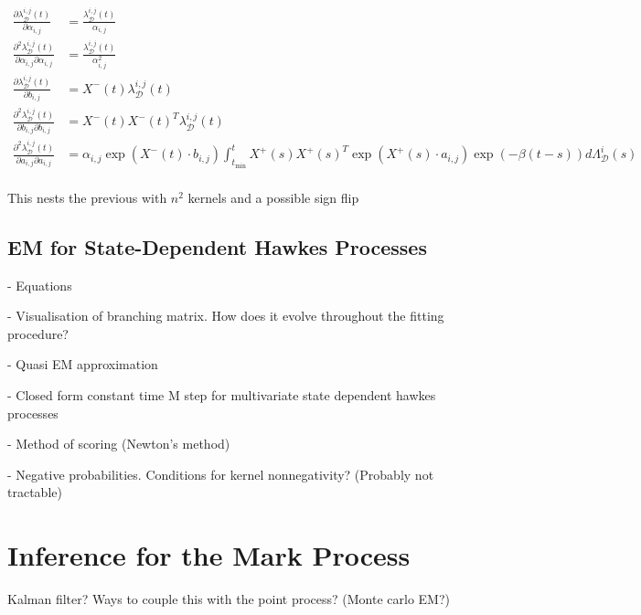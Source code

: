 \documentclass[honours,12pt]{unswthesis}
\numberwithin{equation}{section}
\begin{document}
\begin{equation*}
\begin{align}
		\frac{\partial \lambda_\mathcal{D}^{i,j}(t)}{\partial \alpha_{i,j}} &= \frac{\lambda_\mathcal{D}^{i,j}(t)}{\alpha_{i,j}} \\
		\frac{\partial^2 \lambda_\mathcal{D}^{i,j}(t)}{\partial \alpha_{i,j}\partial\alpha_{i,j}} &= \frac{\lambda_\mathcal{D}^{i,j}(t)}{\alpha_{i,j}^2} \\
		\frac{\partial \lambda_\mathcal{D}^{i,j}(t)}{\partial b_{i,j}} &= X^-(t)\lambda_\mathcal{D}^{i,j}(t) \\
		\frac{\partial^2 \lambda_\mathcal{D}^{i,j}(t)}{\partial b_{i,j}\partial b_{i,j}} &= X^-(t) X^-(t)^T \lambda_\mathcal{D}^{i,j}(t) \\
		\frac{\partial^2 \lambda_\mathcal{D}^{i,j}(t)}{\partial a_{i,j}\partial a_{i,j}} &= \alpha_{i,j}\exp(X^-(t)\cdot b_{i,j}) \int_{t_\mathrm{min}}^t X^+(s) X^+(s)^T \exp(X^+(s)\cdot a_{i,j})\exp(-\beta(t-s))d\Lambda_\mathcal{D}^i(s) \\
	\end{align}
\end{equation*}

This nests the previous with $n^2$ kernels and a possible sign flip

\subsection{EM for State-Dependent Hawkes Processes}
- Equations

- Visualisation of branching matrix. How does it evolve throughout the fitting procedure?

- Quasi EM approximation

- Closed form constant time M step for multivariate state dependent hawkes processes

- Method of scoring (Newton's method)

- Negative probabilities. Conditions for kernel nonnegativity? (Probably not tractable)

\section{Inference for the Mark Process}
Kalman filter? Ways to couple this with the point process? (Monte carlo EM?)
\end{document}
